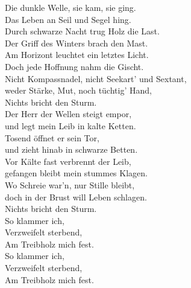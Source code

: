 \begin{itquote}
Die dunkle Welle, sie kam, sie ging.\\
Das Leben an Seil und Segel hing.\\
Durch schwarze Nacht trug Holz die Last.\\
Der Griff des Winters brach den Mast.\\
Am Horizont leuchtet ein letztes Licht.\\
Doch jede Hoffnung nahm die Gischt.\\
Nicht Kompassnadel, nicht Seekart' und Sextant,\\
weder Stärke, Mut, noch tüchtig' Hand,\\
Nichts bricht den Sturm.\\


Der Herr der Wellen steigt empor,\\
und legt mein Leib in kalte Ketten.\\
Tosend öffnet er sein Tor,\\
und zieht hinab in schwarze Betten.\\
Vor Kälte fast verbrennt der Leib,\\
gefangen bleibt mein stummes Klagen.\\
Wo Schreie war'n, nur Stille bleibt,\\
doch in der Brust will Leben schlagen.\\
Nichts bricht den Sturm.\\

So klammer ich,\\
Verzweifelt sterbend,\\
Am Treibholz mich fest.\\

So klammer ich,\\
Verzweifelt sterbend,\\
Am Treibholz mich fest.\\  
\end{itquote}


